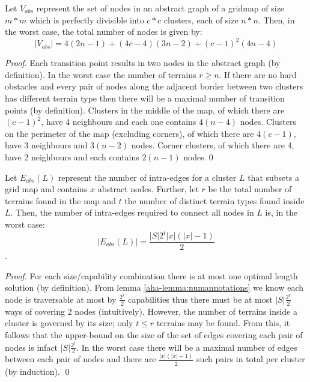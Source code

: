 \begin{lemma}
\label{aha-lemma:maxnodes}
Let $V_{abs}$ represent the set of nodes in an abstract graph of a gridmap of size $m*m$ which is perfectly divisible into $c*c$ clusters, each of size $n*n$. Then, in the worst case, the total number of nodes is given by:
$$|V_{abs}| = 4(2n-1) + (4c - 4)(3n-2) + (c-1)^2(4n-4)$$
\end{lemma}

\begin{proof}
Each transition point results in two nodes in the abstract graph (by definition). 
In the worst case the number of terrains $r \geq n$. 
If there are no hard obstacles and every pair of nodes along the adjacent border between two clusters has different terrain type then there will be a maximal number of transition points (by definition). 
Clusters in the middle of the map, of which there are $(c-1)^2$, have 4 neighbours and each one contains $4(n-4)$ nodes. 
Clusters on the perimeter of the map (excluding corners), of which there are $4(c-1)$, have 3 neighbours and $3(n-2)$ nodes. 
Corner clusters, of which there are 4, have 2 neighbours and each contains $2(n-1)$ nodes.\qed
\end{proof}

\begin{lemma}
\label{aha-lemma:maxedgesincluster}
Let $E_{abs}(L)$ represent the number of intra-edges for a cluster $L$ that subsets a grid map and contains $x$ abstract nodes. Further, let $r$ be the total number of terrains found in the map and $t$ the number of distinct terrain types found inside $L$. Then, the number of intra-edges required to connect all nodes in $L$ is, in the worst case:
 $$|E_{abs}(L)| = \frac{|S|2^t|x|(|x|-1)}{2}$$.
\end{lemma}

\begin{proof}
For each size/capability combination there is at most one optimal length solution (by definition). From lemma \ref{aha-lemma:numannotations} we know each node is traversable at most by $\frac{2^r}{2}$ capabilities thus there must be at most $|S|\frac{2^r}{2} $ ways of covering 2 nodes (intuitively). 
However, the number of terrains inside a cluster is governed by its size; only $t \leq r$ terrains may be found. From this, it follows that the upper-bound on the size of the set of edges covering each pair of nodes is infact $|S|\frac{2^t}{2}$. In the worst case there will be a maximal number of edges between each pair of nodes and there are $\frac{|x|(|x|-1)}{2}$ such pairs in total per cluster (by induction). \qed
\end{proof}

